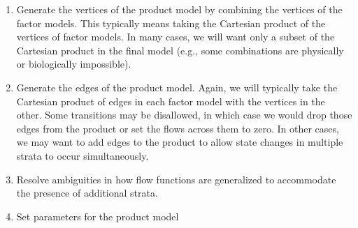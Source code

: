 \begin{enumerate}
    \item Generate the vertices of the product model by combining the vertices of the factor models. This typically means taking the Cartesian product of the vertices of factor models. In many cases, we will want only a subset of the Cartesian product in the final model (e.g., some combinations are physically or biologically impossible).
    \item Generate the edges of the product model. Again, we will typically take the Cartesian product of edges in each factor model with the vertices in the other. Some transitions may be disallowed, in which case we would drop those edges from the product or set the flows across them to zero. In other cases, we may want to add edges to the product to allow state changes in multiple strata to occur simultaneously.
    \item Resolve ambiguities in how flow functions are generalized to accommodate the presence of additional strata.
    \item Set parameters for the product model
\end{enumerate}

